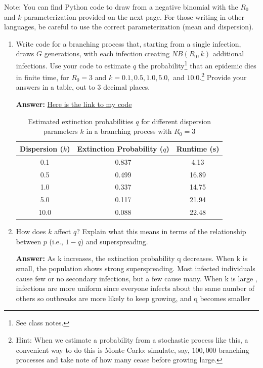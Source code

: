 \documentclass[11pt]{article}
\begin{document}
\begin{enumerate}
Note: You can find Python code to draw from a negative binomial with the $R_0$ and $k$ parameterization provided on the next page. For those writing in other languages, be careful to use the correct parameterization (mean and dispersion).

\begin{enumerate}[label=\alph*.]
	\item Write code for a branching process that, starting from a single infection, draws $G$ generations, with each infection creating $NB(R_0,k)$ additional infections. Use your code to estimate $q$ the probability\footnote{See class notes.} that an epidemic dies in finite time, for $R_0=3$ and $k=0.1, 0.5, 1.0, 5.0,$ and $10.0$.\footnote{Hint: When we estimate a probability from a stochastic process like this, a convenient way to do this is Monte Carlo: simulate, say, $100,000$ branching processes and take note of how many cease before growing large.} Provide your answers in a table, out to 3 decimal places.
	\par
	\textbf{Answer: } \href{https://github.com/ctrlaltaf/csci57897-2/blob/main/code.ipynb}{Here is the link to my code}
	\begin{table}[H]
		\centering
		\caption{Estimated extinction probabilities $q$ for different dispersion parameters $k$ 
		in a branching process with $R_0 = 3$}
		\label{tab:extinction_probabilities}
		\begin{tabular}{c c c}
		\hline
		\textbf{Dispersion ($k$)} & \textbf{Extinction Probability ($q$)} & \textbf{Runtime (s)} \\ 
		\hline
		0.1  & 0.837 & 4.13 \\
		0.5  & 0.499 & 16.89 \\
		1.0  & 0.337 & 14.75 \\
		5.0  & 0.117 & 21.94 \\
		10.0 & 0.088 & 22.48 \\
		\hline
		\end{tabular}
	\end{table}
	\item How does $k$ affect $q$? Explain what this means in terms of the relationship between $p$ (i.e., $1-q$) and superspreading. 
	\par
	\textbf{Answer: }As k increases, the extinction probability q decreases. When k is small, the population shows strong superspreading. Most infected individuals cause few or no secondary infections, but a few cause many.
	When k is large , infections are more uniform since everyone infects about the same number of others so outbreaks are more likely to keep growing, and q becomes smaller

\end{enumerate}
\end{enumerate}
\end{document}
